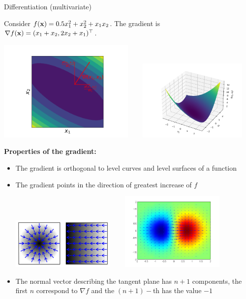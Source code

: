 \begin{vbframe}{Differentiation (multivariate)}
\framebreak

Consider $f(\mathbf{x}) = 0.5 x_1^2 + x_2^2 + x_1 x_2$. The gradient is $\nabla f(\mathbf{x}) = (x_1 + x_2, 2x_2 + x_1)^{\top}$.

\begin{center}
	\includegraphics[width = 0.5\textwidth]{figure_man/grad_unit_vectors.png} ~~~ \includegraphics[width = 0.4\textwidth]{figure_man/gradient2.png}
\end{center}


\framebreak

\textbf{Properties of the gradient:}
\begin{itemize}
	\item The gradient is orthogonal to level curves and level surfaces of a function
	\item The gradient points in the direction of greatest increase of $f$
	\begin{center}
		\includegraphics[width = 0.4\textwidth]{figure_man/gradient3.png} ~~~ \includegraphics[width = 0.4\textwidth]{figure_man/gradient.png}
	\end{center}
	\item The normal vector describing the tangent plane has $n + 1$ components, the first $n$ correspond to $\nabla f$ and the $(n + 1)-$th has the value $-1$
\end{itemize}



\end{vbframe}
